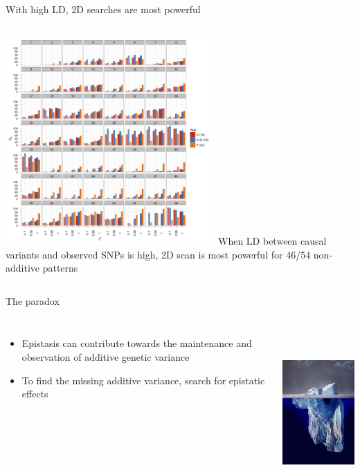 \documentclass{beamer}
\begin{document}
\begin{frame}{With high LD, 2D searches are most powerful}
\begin{columns}[c]
\includegraphics[width=8cm]{sup_heritbars_sim.png}
When LD between causal variants and observed SNPs is high, 2D scan is most powerful for 46/54 non-additive patterns
\end{columns}
\end{frame}

\begin{frame}{The paradox}
\begin{columns}[c]
\begin{itemize}
\item Epistasis can contribute towards the maintenance and observation of additive genetic variance
\item To find the missing additive variance, search for epistatic effects
\end{itemize}
\includegraphics[height=6.5cm]{iceberg.jpg} \\
\end{columns}
\end{frame}
\end{document}
